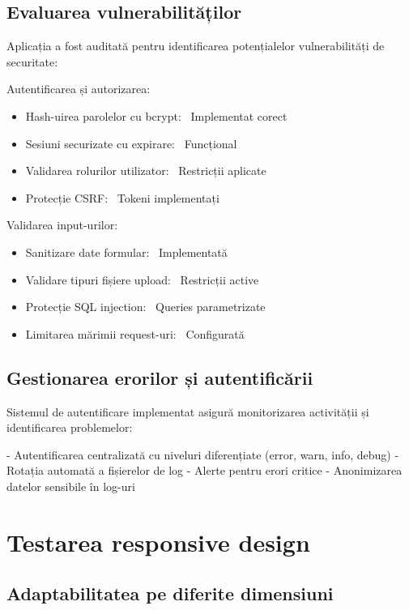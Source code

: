 \documentclass[12pt,a4paper]{report}
\begin{document}
\subsection{Evaluarea vulnerabilităților}

Aplicația a fost auditată pentru identificarea potențialelor vulnerabilități de securitate:

Autentificarea și autorizarea:
\begin{itemize}
\item Hash-uirea parolelor cu bcrypt: \checkmark\ Implementat corect
\item Sesiuni securizate cu expirare: \checkmark\ Funcțional
\item Validarea rolurilor utilizator: \checkmark\ Restricții aplicate
\item Protecție CSRF: \checkmark\ Tokeni implementați
\end{itemize}

Validarea input-urilor:
\begin{itemize}
\item Sanitizare date formular: \checkmark\ Implementată
\item Validare tipuri fișiere upload: \checkmark\ Restricții active
\item Protecție SQL injection: \checkmark\ Queries parametrizate
\item Limitarea mărimii request-uri: \checkmark\ Configurată
\end{itemize}


\subsection{Gestionarea erorilor și autentificării}

Sistemul de autentificare implementat asigură monitorizarea activității și identificarea problemelor:

- Autentificarea centralizată cu niveluri diferențiate (error, warn, info, debug)
- Rotația automată a fișierelor de log
- Alerte pentru erori critice
- Anonimizarea datelor sensibile în log-uri

\section{Testarea responsive design}

\subsection{Adaptabilitatea pe diferite dimensiuni}
\end{document}
